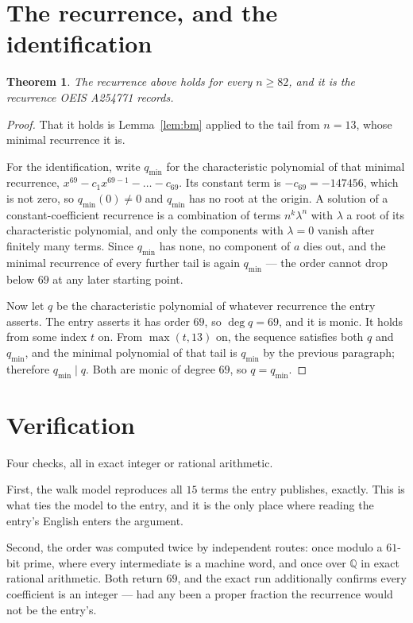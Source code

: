 \documentclass[11pt,a4paper]{article}
\theoremstyle{plain}
\newtheorem{theorem}{Theorem}
\theoremstyle{definition}
\begin{document}
\section{The recurrence, and the identification}

\begin{theorem}
The recurrence above holds for every $n\ge82$, and it is the recurrence OEIS A254771 records.
\end{theorem}

\begin{proof}
That it holds is Lemma~\ref{lem:bm} applied to the tail from $n=13$, whose minimal
recurrence it is.

For the identification, write $q_{\min}$ for the characteristic polynomial of that minimal
recurrence, $x^{69}-c_1x^{69-1}-\dots-c_{69}$. Its constant term is
$-c_{69}=-147456$, which is not zero, so $q_{\min}(0)\neq0$ and $q_{\min}$ has no
root at the origin. A solution of a constant-coefficient recurrence is a combination of terms
$n^{k}\lambda^{n}$ with $\lambda$ a root of its characteristic polynomial, and only the
components with $\lambda=0$ vanish after finitely many terms. Since $q_{\min}$ has none, no
component of $a$ dies out, and the minimal recurrence of every further tail is again
$q_{\min}$ --- the order cannot drop below $69$ at any later starting point.

Now let $q$ be the characteristic polynomial of whatever recurrence the entry asserts. The
entry asserts it has order $69$, so $\deg q=69$, and it is monic. It holds from some
index $t$ on. From $\max(t,13)$ on, the sequence satisfies both $q$ and $q_{\min}$, and
the minimal polynomial of that tail is $q_{\min}$ by the previous paragraph; therefore
$q_{\min}\mid q$. Both are monic of degree $69$, so $q=q_{\min}$.
\end{proof}

\section{Verification}

Four checks, all in exact integer or rational arithmetic.

First, the walk model reproduces all $15$ terms the entry publishes, exactly. This is
what ties the model to the entry, and it is the only place where reading the entry's English
enters the argument.

Second, the order was computed twice by independent routes: once modulo a $61$-bit prime, where
every intermediate is a machine word, and once over $\mathbb{Q}$ in exact rational arithmetic.
Both return $69$, and the exact run additionally confirms every coefficient is an integer
--- had any been a proper fraction the recurrence would not be the entry's.
\end{document}
